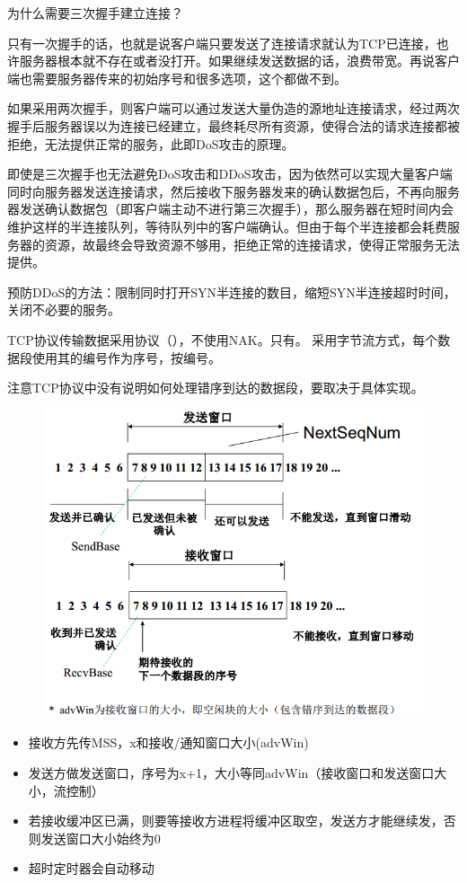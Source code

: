 \begin{example}
    为什么需要三次握手建立连接？
\end{example}
\begin{analysis}
    只有一次握手的话，也就是说客户端只要发送了连接请求就认为TCP已连接，也许服务器根本就不存在或者没打开。如果继续发送数据的话，浪费带宽。再说客户端也需要服务器传来的初始序号和很多选项，这个都做不到。

    如果采用两次握手，则客户端可以通过发送大量伪造的源地址连接请求，经过两次握手后服务器误以为连接已经建立，最终耗尽所有资源，使得合法的请求连接都被拒绝，无法提供正常的服务，此即DoS攻击的原理。

    即使是三次握手也无法避免DoS攻击和DDoS攻击，因为依然可以实现大量客户端同时向服务器发送连接请求，然后接收下服务器发来的确认数据包后，不再向服务器发送确认数据包（即客户端主动不进行第三次握手），那么服务器在短时间内会维护这样的半连接队列，等待队列中的客户端确认。但由于每个半连接都会耗费服务器的资源，故最终会导致资源不够用，拒绝正常的连接请求，使得正常服务无法提供。

    预防DDoS的方法：限制同时打开SYN半连接的数目，缩短SYN半连接超时时间，关闭不必要的服务。
\end{analysis}

\myhline
TCP协议传输数据采用协议（），不使用NAK。只有。
采用字节流方式，每个数据段使用其的编号作为序号，按编号。

注意TCP协议中没有说明如何处理错序到达的数据段，要取决于具体实现。

\begin{figure}[H]
    \centering
    \includegraphics[width=0.6\linewidth]{fig/TCP-window.PNG}
\end{figure}
\begin{itemize}
\item 接收方先传MSS，x和接收/通知窗口大小(advWin)
\item 发送方做发送窗口，序号为x+1，大小等同advWin（接收窗口和发送窗口大小，流控制）
\item 若接收缓冲区已满，则要等接收方进程将缓冲区取空，发送方才能继续发，否则发送窗口大小始终为0
\item 超时定时器会自动移动
\end{itemize}

